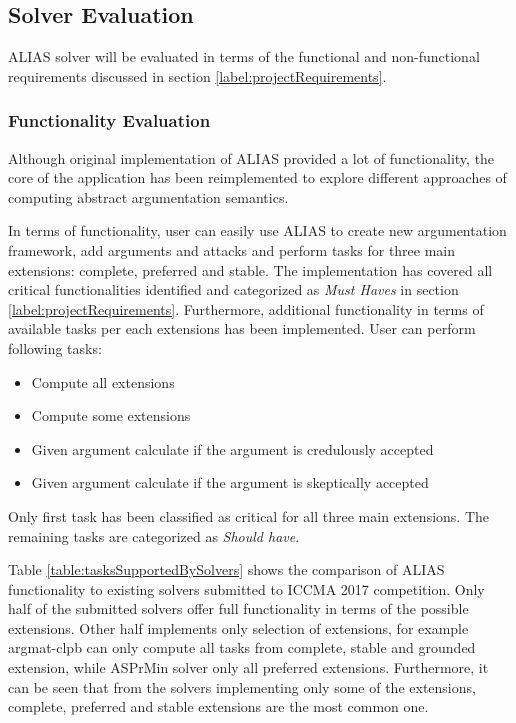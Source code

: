 \subsection{Solver Evaluation}
ALIAS solver will be evaluated in terms of the functional and non-functional requirements discussed in section \ref{label:projectRequirements}. 

\subsubsection{Functionality Evaluation}
Although original implementation of ALIAS provided a lot of functionality, the core of the application has been reimplemented to explore different approaches of computing abstract argumentation semantics. 

In terms of functionality, user can easily use ALIAS to create new argumentation framework, add arguments and attacks and perform tasks for three main extensions: complete, preferred and stable. The implementation has covered all critical functionalities identified and categorized as \textit{Must Haves} in section \ref{label:projectRequirements}. Furthermore, additional functionality in terms of available tasks per each extensions has been implemented. User can perform following tasks:
\begin{itemize}
	\item Compute all extensions
	\item Compute some extensions
	\item Given argument calculate if the argument is credulously accepted 
	\item Given argument calculate if the argument is skeptically accepted
\end{itemize}
Only first task has been classified as critical for all three main extensions. The remaining tasks are categorized as \textit{Should have}. 

Table \ref{table:tasksSupportedBySolvers} shows the comparison of ALIAS functionality to existing solvers submitted to ICCMA 2017 competition. Only half of the submitted solvers offer full functionality in terms of the possible extensions. Other half implements only selection of extensions, for example argmat-clpb can only compute all tasks from complete, stable and grounded extension, while ASPrMin solver only all preferred extensions. Furthermore, it can be seen that from the solvers implementing only some of the extensions, complete, preferred and stable extensions are the most common one.
	
